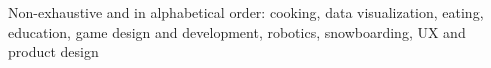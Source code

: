 \documentclass[10pt,a4paper]{article}
\begin{document}


\spacedhrule{1.6em}{-0.4em}


\inlineheadsection
  {Non-exhaustive and in alphabetical order:}
  {cooking, data visualization, eating, education, game design and development, robotics, snowboarding, UX and product design}











\end{document}

